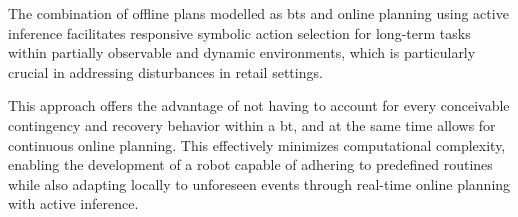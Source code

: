 The combination of offline plans modelled as \acp{bt} and
online planning using active inference facilitates
responsive symbolic action selection for long-term tasks within
partially observable and dynamic environments, which is
particularly crucial in addressing disturbances in retail
settings. 

 This approach offers the advantage of not having to account
 for every conceivable contingency and recovery behavior
 within a \ac{bt}, and at the same time allows for continuous online planning.
 This effectively minimizes computational complexity, enabling the development of a robot capable of adhering to predefined routines while also adapting locally to unforeseen events through real-time online planning with active inference.
